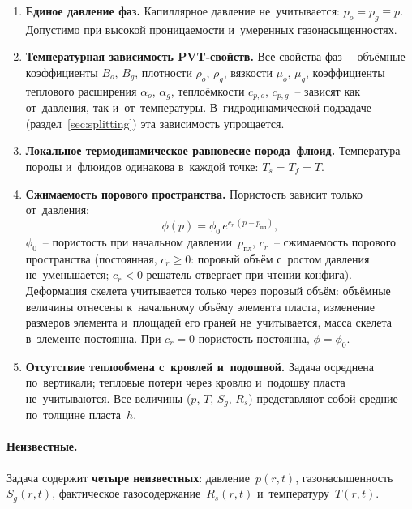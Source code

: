\documentclass[12pt,a4paper]{article}
\newcommand{\ppl}{p_{\text{пл}}}
\begin{document}
\begin{enumerate}[label=\arabic*., nosep]
  \item \textbf{Единое давление фаз.}
        Капиллярное давление не~учитывается: $p_o = p_g \equiv p$.
        Допустимо при высокой проницаемости и~умеренных
        газонасыщенностях.
  \item \textbf{Температурная зависимость PVT-свойств.}
        Все свойства фаз~-- объёмные коэффициенты $B_o$, $B_g$,
        плотности $\rho_o$, $\rho_g$, вязкости $\mu_o$, $\mu_g$,
        коэффициенты теплового расширения $\alpha_o$, $\alpha_g$,
        теплоёмкости $c_{p,o}$, $c_{p,g}$~-- зависят как от~давления,
        так и~от~температуры.
        В~гидродинамической подзадаче (раздел~\ref{sec:splitting}) эта
        зависимость упрощается.
  \item \textbf{Локальное термодинамическое равновесие порода--флюид.}
        Температура породы и~флюидов одинакова в~каждой точке:
        $T_s = T_f = T$.
  \item \textbf{Сжимаемость порового пространства.}
        Пористость зависит только от~давления:
        \begin{equation}\label{eq:porosity}
          \phi(p) = \phi_0\,e^{c_r\,(p - \ppl)},
        \end{equation}
        $\phi_0$~-- пористость при начальном давлении~$\ppl$,
        $c_r$~-- сжимаемость порового пространства (постоянная, $c_r \ge 0$:
        поровый объём с~ростом давления не~уменьшается; $c_r < 0$ решатель
        отвергает при чтении конфига).
        Деформация скелета учитывается только через поровый объём:
        объёмные величины отнесены к~начальному объёму элемента пласта,
        изменение размеров элемента и~площадей его граней не~учитывается,
        масса скелета в~элементе постоянна. При $c_r = 0$ пористость
        постоянна, $\phi = \phi_0$.
  \item \textbf{Отсутствие теплообмена с~кровлей и~подошвой.}
        Задача осреднена по~вертикали; тепловые потери через кровлю
        и~подошву пласта не~учитываются. Все величины ($p$, $T$, $S_g$,
        $R_s$) представляют собой средние по~толщине пласта~$h$.
\end{enumerate}

\paragraph{Неизвестные.}
Задача содержит \textbf{четыре неизвестных}: давление~$p(r,t)$,
газонасыщенность~$S_g(r,t)$, фактическое газосодержание~$R_s(r,t)$
и~температуру~$T(r,t)$.
\end{document}
